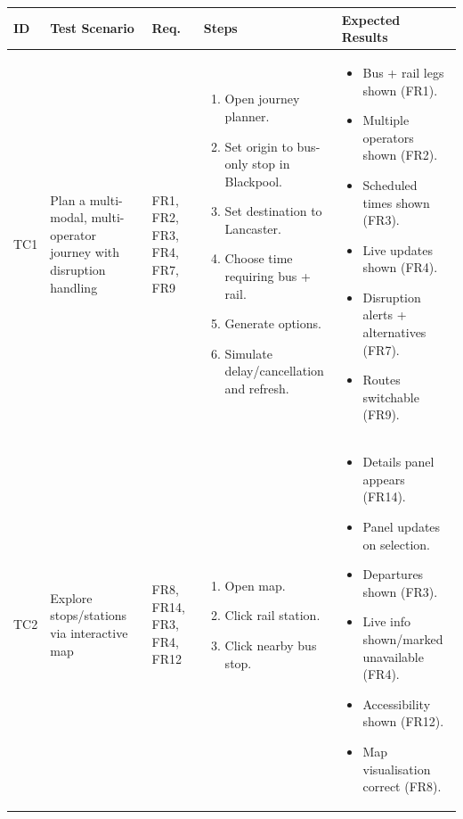 \documentclass{article}
\begin{document}
\begin{table}[H]
\centering
\footnotesize
\begin{tabularx}{\textwidth}{|l|X|X|X|X|}
\hline
\textbf{ID} & \textbf{Test Scenario} & \textbf{Req.} & \textbf{Steps} & \textbf{Expected Results} \\
\hline

TC1 &
Plan a multi-modal, multi-operator journey with disruption handling &
FR1, FR2, FR3, FR4, FR7, FR9 &
\begin{enumerate}[nosep,leftmargin=*]
\item Open journey planner.
\item Set origin to bus-only stop in Blackpool.
\item Set destination to Lancaster.
\item Choose time requiring bus + rail.
\item Generate options.
\item Simulate delay/cancellation and refresh.
\end{enumerate}
&
\begin{itemize}[nosep,leftmargin=*]
\item Bus + rail legs shown (FR1).
\item Multiple operators shown (FR2).
\item Scheduled times shown (FR3).
\item Live updates shown (FR4).
\item Disruption alerts + alternatives (FR7).
\item Routes switchable (FR9).
\end{itemize}
\\
\hline

TC2 &
Explore stops/stations via interactive map &
FR8, FR14, FR3, FR4, FR12 &
\begin{enumerate}[nosep,leftmargin=*]
\item Open map.
\item Click rail station.
\item Click nearby bus stop.
\end{enumerate}
&
\begin{itemize}[nosep,leftmargin=*]
\item Details panel appears (FR14).
\item Panel updates on selection.
\item Departures shown (FR3).
\item Live info shown/marked unavailable (FR4).
\item Accessibility shown (FR12).
\item Map visualisation correct (FR8).
\end{itemize}
\\
\hline


\end{tabularx}
\end{table}
\end{document}
